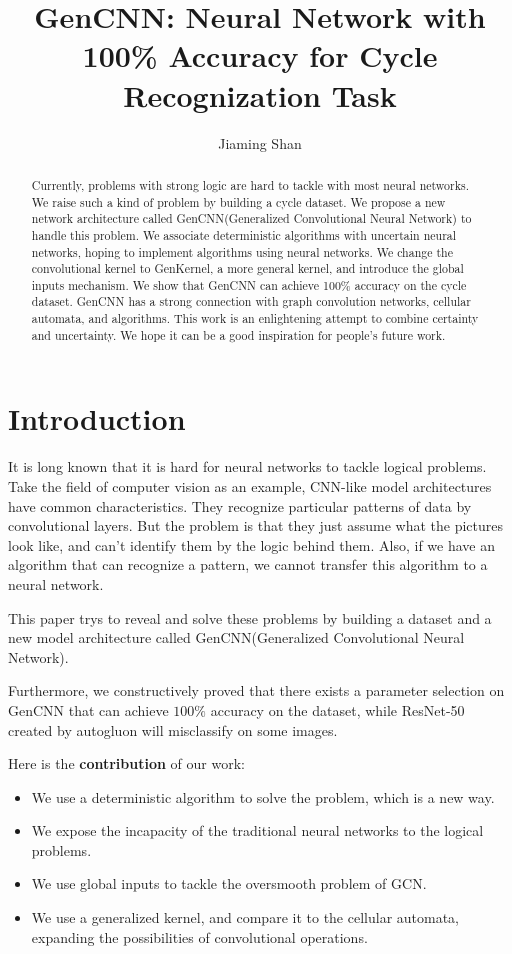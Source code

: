 \documentclass{article}
\title{GenCNN: Neural Network with 100\% Accuracy for Cycle Recognization Task}
\author{
  Jiaming Shan
}
\begin{document}
\maketitle


\begin{abstract}
    Currently, problems with strong logic are hard to tackle with most neural networks. 
    We raise such a kind of problem by building a cycle dataset. We propose a new network architecture called GenCNN(Generalized Convolutional Neural Network) to handle this problem. 
    We associate deterministic algorithms with uncertain neural networks, 
    hoping to implement algorithms using neural networks.
    We change the convolutional kernel to GenKernel, a more general kernel, and introduce the global inputs mechanism.
    We show that GenCNN can achieve 100\% accuracy on the cycle dataset.
    GenCNN has a strong connection with graph convolution networks, cellular automata, and algorithms.
    This work is an enlightening attempt to combine certainty and uncertainty.
    We hope it can be a good inspiration for people's future work.

\end{abstract}


\section{Introduction}
It is long known that it is hard for neural networks to tackle logical problems. 
Take the field of computer vision as an example, CNN-like \cite{krizhevsky2012imagenet} model architectures have common characteristics.
They recognize particular patterns of data by convolutional layers.
But the problem is that they just assume what the pictures look like, 
and can't identify them by the logic behind them.
Also, if we have an algorithm that can recognize a pattern, we cannot transfer this algorithm to a neural network.

This paper trys to reveal and solve these problems by building a dataset and a new model architecture called GenCNN(Generalized Convolutional Neural Network). 

Furthermore, we constructively proved that there exists a parameter selection on GenCNN that can achieve $100\%$ accuracy on the dataset,
while ResNet-50 \cite{he2016deep} created by autogluon \cite{agtabular} will misclassify on some images.

Here is the \textbf{contribution} of our work:

\begin{itemize}
    \item We use a deterministic algorithm to solve the problem, which is a new way. 
    \item We expose the incapacity of the traditional neural networks to the logical problems.
    \item We use global inputs to tackle the oversmooth problem of GCN.
    \item We use a generalized kernel, and compare it to the cellular automata, expanding the possibilities of convolutional operations.
\end{itemize}
\end{document}

